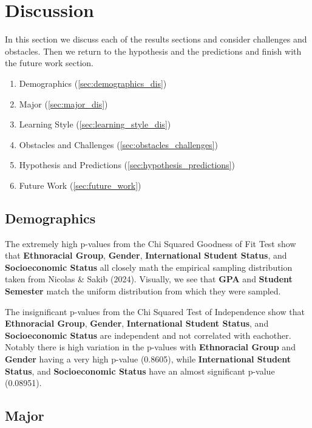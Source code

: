 \documentclass{article}
\providecommand{\tightlist}{%
  \setlength{\itemsep}{0pt}\setlength{\parskip}{0pt}}
\begin{document}
\section{Discussion}\label{discussion}

In this section we discuss each of the results sections and consider challenges and obstacles. Then we return to the hypothesis and the predictions and finish with the future work section.

\begin{enumerate}
\def\labelenumi{\arabic{enumi}.}
\tightlist
\item
  Demographics (\ref{sec:demographics_dis})
\item
  Major (\ref{sec:major_dis})
\item
  Learning Style (\ref{sec:learning_style_dis})
\item
  Obstacles and Challenges (\ref{sec:obstacles_challenges})
\item
  Hypothesis and Predictions (\ref{sec:hypothesis_predictions})
\item
  Future Work (\ref{sec:future_work})
\end{enumerate}

\subsection{Demographics}\label{demographics-2}

\label{sec:demographics_dis}

The extremely high p-values from the Chi Squared Goodness of Fit Test show that \textbf{Ethnoracial Group}, \textbf{Gender}, \textbf{International Student Status}, and \textbf{Socioeconomic Status} all closely math the empirical sampling distribution taken from Nicolas \& Sakib (2024). Visually, we see that \textbf{GPA} and \textbf{Student Semester} match the uniform distribution from which they were sampled.

The insignificant p-values from the Chi Squared Test of Independence show that \textbf{Ethnoracial Group}, \textbf{Gender}, \textbf{International Student Status}, and \textbf{Socioeconomic Status} are independent and not correlated with eachother. Notably there is high variation in the p-values with \textbf{Ethnoracial Group} and \textbf{Gender} having a very high p-value (0.8605), while \textbf{International Student Status}, and \textbf{Socioeconomic Status} have an almost significant p-value (0.08951).

\subsection{Major}\label{major-2}
\end{document}
